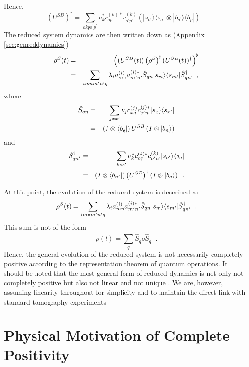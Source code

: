 Hence,
$$
\left(U^{SB}\right)^\dagger = \sum_{okpo^\prime p^\prime} \nu_k^* c_{op}^{(k)*}c_{o^\prime p^\prime}^{(k)} \left(|s_{o^\prime} \rangle\langle s_{o} | \otimes |b_{p^\prime} \rangle\langle b_{p} |\right)\;\;.
$$
The reduced system dynamics are then written down as (Appendix \ref{sec:genreddynamics})
\begin{eqnarray*}
\rho^S (t) &=& \left((U^{SB}(t))\left(\rho^{S}\right)^\sharp(U^{SB}(t))^\dagger\right)^\flat  \\
&=& \sum_{imnm^\prime n^\prime q} \lambda_i a_{mn}^{(i)} a_{m^\prime n^\prime}^{(i)*} \hat{S}_{qn} |s_m\rangle\langle s_{m^\prime}| \hat{S}_{qn^\prime}^\dagger\;\;,
\end{eqnarray*}
where
\begin{eqnarray}
\label{eqn:formalS}
\hat{S}_{qn} &=& \sum_{jxx^\prime} \nu_j c_{xq}^{(j)} c_{x^\prime n}^{(j)*} |s_x\rangle\langle s_{x^\prime}|\\
&=& \left( I\otimes \left\langle b_q\right|\right)U^{SB}\left(I\otimes \left|b_n\right\rangle\right)
\end{eqnarray}
and
\begin{eqnarray*}
\hat{S}_{qn^\prime}^\dagger &=& \sum_{koo^\prime} \nu_k^* c_{oq}^{(k)*} c_{o^\prime n^\prime}^{(k)} |s_{o^\prime}\rangle\langle s_{o}|\\
&=& \left( I\otimes \left\langle b_{n^\prime}\right|\right)\left(U^{SB}\right)^\dagger\left(I\otimes \left|b_q\right\rangle\right)\;\;.
\end{eqnarray*}

At this point, the evolution of the reduced system is described as
\begin{equation}
\label{eqn:gensumeqn}
\rho^S(t) = \sum_{imnm^\prime n^\prime q} \lambda_i a_{mn}^{(i)} a_{m^\prime n^\prime}^{(i)*} \hat{S}_{qn} |s_m\rangle\langle s_{m^\prime}| \hat{S}_{qn^\prime}^\dagger\;\;.
\end{equation}
This sum is not of the form 
$$
\rho(t) = \sum_q \hat{S}_q \rho \hat{S}_q^\dagger\;\;.
$$
Hence, the general evolution of the reduced system is not necessarily completely positive according to the representation theorem of quantum operations.  It should be noted that the most general form of reduced dynamics is not only not completely positive but also not linear and not unique \cite{Lendi2000,Carteret2008}.  We are, however, assuming linearity throughout for simplicity and to maintain the direct link with standard tomography experiments.   

\chapter{Physical Motivation of Complete Positivity}
\label{sec:physmot}

